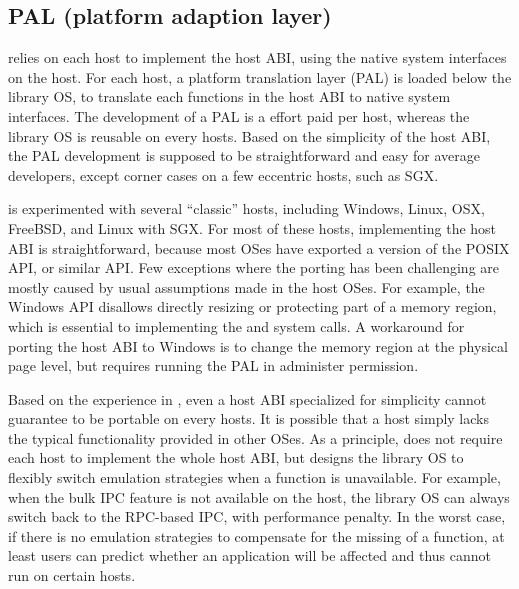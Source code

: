 \subsection{PAL (platform adaption layer)}
\label{sec:overview:host:pal}


\graphene{} relies on each host to implement the host ABI, using the native system interfaces on the host.
For each host, a platform translation layer (PAL)
is loaded below the library OS, to translate each functions in the host ABI to native system interfaces.
The development of a PAL is a effort paid per host, whereas the library OS is reusable on every hosts. %
Based on the simplicity of the host ABI, the PAL development is supposed to be straightforward and easy for average developers, except corner cases on a few eccentric hosts, such as SGX.




\graphene{} is experimented with
several ``classic'' hosts, including Windows, Linux, OSX, FreeBSD, and Linux with SGX.
For most of these hosts,
implementing the host ABI is straightforward,
because most OSes have exported a version of the POSIX API, or similar API.
Few exceptions where the porting has been challenging
are mostly caused by usual assumptions made in the host OSes.
For example, the Windows API disallows directly resizing or protecting part of a memory region, which is essential to implementing the  and  system calls.
A workaround for porting the host ABI to Windows is to change the memory region
at the physical page level,
but requires running the PAL in administer permission.




Based on the experience in \graphene{},
even a host ABI specialized for simplicity cannot guarantee to be portable on every hosts.
It is possible that a host simply lacks the typical functionality
provided in other OSes.
As a principle, \graphene{} does not require each host to implement the whole host ABI,
but designs the library OS to flexibly switch emulation strategies
when a function is unavailable.
For example, when the bulk IPC feature is not available on the host,
the library OS can always switch back to the RPC-based IPC, with performance penalty.
In the worst case, if there is no emulation strategies
to compensate for the missing of a function,
at least users can predict whether an application will be affected and thus cannot run on certain hosts.



